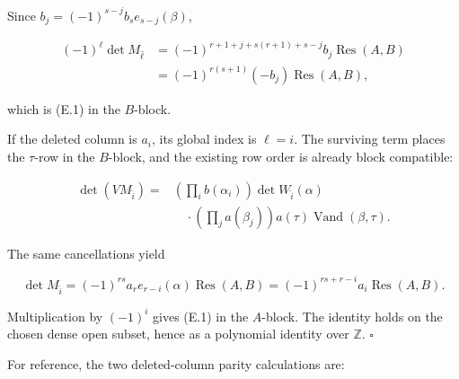 \documentclass[
  11pt,
  a4paper,
]{article}
\begin{document}
Since \(b_j=(-1)^{s-j}b_se_{s-j}(\beta)\),

\[
 \begin{aligned}
 (-1)^\ell\det M_{\widehat\ell}
 &=(-1)^{r+1+j+s(r+1)+s-j}
   b_j\operatorname{Res}(A,B)\\
 &=(-1)^{r(s+1)}(-b_j)\operatorname{Res}(A,B),
 \end{aligned}
\]

which is (E.1) in the \(B\)-block.

If the deleted column is \(a_i\), its global index is \(\ell=i\). The
surviving term places the \(\tau\)-row in the \(B\)-block, and the
existing row order is already block compatible:

\[
 \begin{aligned}
 \det(VM_{\widehat i})
 ={}&\left(\prod_i b(\alpha_i)\right)
 \det W_{\widehat i}(\alpha)\\
 &\quad\cdot
 \left(\prod_j a(\beta_j)\right)a(\tau)
 \operatorname{Vand}(\beta,\tau).
 \end{aligned}
\tag{E.6}
\]

The same cancellations yield

\[
 \det M_{\widehat i}
 =(-1)^{rs}a_re_{r-i}(\alpha)\operatorname{Res}(A,B)
 =(-1)^{rs+r-i}a_i\operatorname{Res}(A,B).
\tag{E.7}
\]

Multiplication by \((-1)^i\) gives (E.1) in the \(A\)-block. The
identity holds on the chosen dense open subset, hence as a polynomial
identity over \(\mathbb Z\). \(\square\)

For reference, the two deleted-column parity calculations are:
\end{document}

